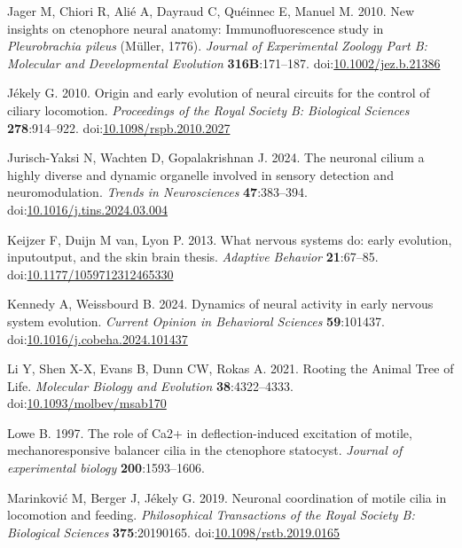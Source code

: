 \documentclass[
  11pt,
]{article}
\newlength{\cslhangindent}
\newenvironment{CSLReferences}[2] %
 {\begin{list}{}{%
  \setlength{\itemindent}{0pt}
  \setlength{\leftmargin}{0pt}
  \setlength{\parsep}{0pt}
  \ifodd #1
   \setlength{\leftmargin}{\cslhangindent}
   \setlength{\itemindent}{-1\cslhangindent}
  \fi
  \setlength{\itemsep}{#2\baselineskip}}}
 {\end{list}}
\begin{document}
\begin{CSLReferences}{1}{0}
Jager M, Chiori R, Alié A, Dayraud C, Quéinnec E, Manuel M. 2010. New
insights on ctenophore neural anatomy: Immunofluorescence study in
{\emph{Pleurobrachia pileus}} (Müller, 1776). \emph{Journal of
Experimental Zoology Part B: Molecular and Developmental Evolution}
\textbf{316B}:171--187.
doi:\href{https://doi.org/10.1002/jez.b.21386}{10.1002/jez.b.21386}

Jékely G. 2010. Origin and early evolution of neural circuits for the
control of ciliary locomotion. \emph{Proceedings of the Royal Society B:
Biological Sciences} \textbf{278}:914--922.
doi:\href{https://doi.org/10.1098/rspb.2010.2027}{10.1098/rspb.2010.2027}

Jurisch-Yaksi N, Wachten D, Gopalakrishnan J. 2024. The neuronal cilium
{\textendash} a highly diverse and dynamic organelle involved in sensory
detection and neuromodulation. \emph{Trends in Neurosciences}
\textbf{47}:383--394.
doi:\href{https://doi.org/10.1016/j.tins.2024.03.004}{10.1016/j.tins.2024.03.004}

Keijzer F, Duijn M van, Lyon P. 2013. What nervous systems do: early
evolution, input{\textendash}output, and the skin brain thesis.
\emph{Adaptive Behavior} \textbf{21}:67--85.
doi:\href{https://doi.org/10.1177/1059712312465330}{10.1177/1059712312465330}

Kennedy A, Weissbourd B. 2024. Dynamics of neural activity in early
nervous system evolution. \emph{Current Opinion in Behavioral Sciences}
\textbf{59}:101437.
doi:\href{https://doi.org/10.1016/j.cobeha.2024.101437}{10.1016/j.cobeha.2024.101437}

Li Y, Shen X-X, Evans B, Dunn CW, Rokas A. 2021. Rooting the Animal Tree
of Life. \emph{Molecular Biology and Evolution} \textbf{38}:4322--4333.
doi:\href{https://doi.org/10.1093/molbev/msab170}{10.1093/molbev/msab170}

Lowe B. 1997. The role of Ca2+ in deflection-induced excitation of
motile, mechanoresponsive balancer cilia in the ctenophore statocyst.
\emph{Journal of experimental biology} \textbf{200}:1593--1606.

Marinković M, Berger J, Jékely G. 2019. Neuronal coordination of motile
cilia in locomotion and feeding. \emph{Philosophical Transactions of the
Royal Society B: Biological Sciences} \textbf{375}:20190165.
doi:\href{https://doi.org/10.1098/rstb.2019.0165}{10.1098/rstb.2019.0165}


\end{CSLReferences}
\end{document}
